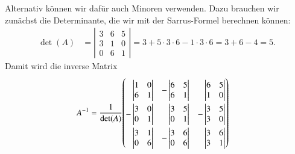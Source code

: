 Alternativ können wir dafür auch Minoren verwenden.
Dazu brauchen wir zunächst die Determinante, die wir mit der Sarrus-Formel
berechnen können:
\begin{align*}
\det(A)
&
=
\left|
\begin{matrix}
3&6&5\\
3&1&0\\
0&6&1
\end{matrix}
\right|
=
3+5\cdot3\cdot6-1\cdot3\cdot 6
=
3+6-4=5.
\end{align*}
Damit wird die inverse Matrix
\begin{align*}
A^{-1}
&=
\frac1{\det(A)}
{
\def\arraystretch{2.2}
\begin{pmatrix}
\def\arraystretch{1}
\phantom{-}
\left|\begin{matrix} 1&0\\6&1 \end{matrix}\right|&
\def\arraystretch{1}
-
\left|\begin{matrix} 6&5\\6&1 \end{matrix}\right|&
\def\arraystretch{1}
\phantom{-}
\left|\begin{matrix} 6&5\\1&0 \end{matrix}\right|
\\
\def\arraystretch{1}
-
\left|\begin{matrix} 3&0\\0&1 \end{matrix}\right|&
\def\arraystretch{1}
\phantom{-}
\left|\begin{matrix} 3&5\\0&1 \end{matrix}\right|&
\def\arraystretch{1}
-
\left|\begin{matrix} 3&5\\3&0 \end{matrix}\right|
\\
\def\arraystretch{1}
\phantom{-}
\left|\begin{matrix} 3&1\\0&6 \end{matrix}\right|&
\def\arraystretch{1}
-
\left|\begin{matrix} 3&6\\0&6 \end{matrix}\right|&
\def\arraystretch{1}
\phantom{-}
\left|\begin{matrix} 3&6\\3&1 \end{matrix}\right|

\end{pmatrix}}
\end{align*}
